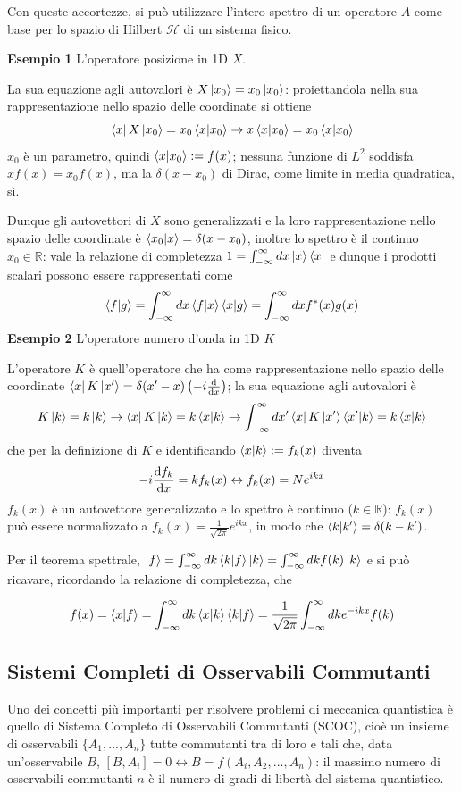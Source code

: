 Con queste accortezze, si può utilizzare l'intero spettro di un operatore $ A $ come base
per lo spazio di Hilbert $ \mathcal{H} $ di un sistema fisico.

\textbf{Esempio 1} L'operatore posizione in 1D $ X $.

La sua equazione agli autovalori è $ X\ket{x_0} = x_0\ket{x_0} $: proiettandola nella 
sua rappresentazione nello spazio delle coordinate si ottiene
$$ \bra{x}X\ket{x_0} = x_0\bra{x}\ket{x_0} \to x\bra{x}\ket{x_0} = x_0\bra{x}\ket{x_0} $$
$ x_0 $ è un parametro, quindi $ \bra{x}\ket{x_0} := f(x) $; nessuna funzione di $ L^2 $
soddisfa $ xf(x) = x_0f(x) $, ma la $\delta(x-x_0)$ di Dirac, come limite in media quadratica,
sì.

Dunque gli autovettori di $X$ sono generalizzati e la loro rappresentazione nello spazio delle
coordinate è $ \bra{x_0}\ket{x} = \delta(x-x_0) $,
inoltre lo spettro è il continuo $ x_0\in\mathbb{R} $:
vale la relazione di completezza $ 1=\int_{-\infty}^{\infty}dx\ket{x}\bra{x} $ e dunque
i prodotti scalari possono essere rappresentati come
$$ \bra{f}\ket{g} = \int_{-\infty}^{\infty}dx \bra{f}\ket{x}\bra{x}\ket{g} =
\int_{-\infty}^{\infty}dxf^*(x)g(x)$$
\newpage
\textbf{Esempio 2} L'operatore numero d'onda in 1D $ K $ 

L'operatore $ K $ è quell'operatore che ha come rappresentazione nello spazio delle coordinate
$ \bra{x}K\ket{x'} = \delta(x'-x)\left( -i\dv{x} \right) $; la sua equazione agli autovalori è
$$ K\ket{k} = k\ket{k} \to \bra{x}K\ket{k} = k\bra{x}\ket{k} \to
\int_{-\infty}^{\infty}dx'\bra{x}K\ket{x'}\bra{x'}\ket{k} = k\bra{x}\ket{k} $$
che per la definizione di $ K $ e identificando $ \bra{x}\ket{k} := f_k(x) $ diventa
$$ -i\dv{f_k}{x} = kf_k(x) \leftrightarrow f_k(x) = N e^{ikx}$$
$ f_k(x) $ è un autovettore generalizzato e lo spettro è continuo ($ k\in\mathbb{R} $): 
$ f_k(x) $ può essere normalizzato a
$ f_k(x) = \frac{1}{\sqrt{2\pi}}e^{ikx} $, in modo che $ \bra{k}\ket{k'} = \delta(k-k') $. 

Per il teorema spettrale, $ \ket{f} = \int_{-\infty}^{\infty}dk\bra{k}\ket{f}\ket{k}
= \int_{-\infty}^{\infty}dkf(k)\ket{k}$ e si
può ricavare, ricordando la relazione di completezza, che

$$ f(x)=\bra{x}\ket{f} = \int_{-\infty}^{\infty}dk\bra{x}\ket{k}\bra{k}\ket{f} = 
\frac{1}{\sqrt{2\pi}}\int_{-\infty}^{\infty}dk e^{-ikx}f(k)$$ 


\subsection{Sistemi Completi di Osservabili Commutanti}
Uno dei concetti più importanti per risolvere problemi di meccanica quantistica è
quello di Sistema Completo di Osservabili Commutanti (SCOC), cioè un insieme di osservabili
$ \{ A_1,...,A_n \} $ tutte commutanti tra di loro e tali che, data un'osservabile $B$,
$[B,A_i] = 0\leftrightarrow B =f(A_i,A_2,...,A_n)$: il massimo
numero di osservabili commutanti $ n $ è il numero di gradi di libertà del sistema quantistico.

